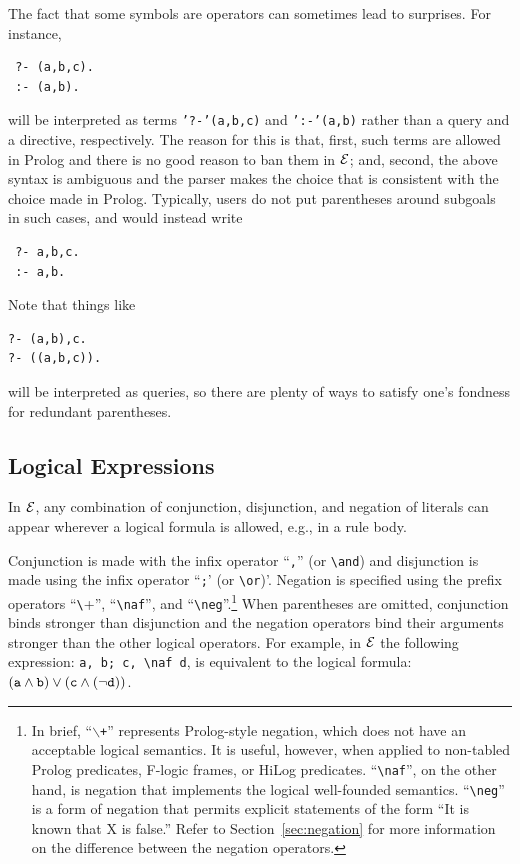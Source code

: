 \documentclass[11pt]{article}
\newcommand{\ERGO}{\mbox{\ensuremath{\cal{E}}\smaller{{\sc{RGO}}}}\xspace}
\newcommand{\FLSYSTEM}{\ERGO}
\newcommand{\bs}{\textbackslash}
\newcommand{\PLGNAF}{\mbox{\texttt{\bs}+}\xspace}
\newcommand{\RULELOGNAF}{{\texttt{{\bs}naf}}\xspace}
\newcommand{\RULELOGNEG}{{\texttt{{\bs}neg}}\xspace}
\begin{document}
The fact that some symbols are operators can sometimes lead to
surprises. For instance,
\begin{verbatim}
 ?- (a,b,c).
 :- (a,b).
\end{verbatim}
will be interpreted as terms {\tt '?-'(a,b,c)} and {\tt ':-'(a,b)} rather
than a query and a directive, respectively. The reason for this is that,
first, such terms are allowed in Prolog and there is no good reason to ban
them in \FLSYSTEM; and, second, the above syntax is ambiguous and the parser
makes the choice that is consistent with the choice made in
Prolog. Typically, users do not put parentheses around subgoals in such
cases, and would instead write
\begin{verbatim}
 ?- a,b,c.
 :- a,b.  
\end{verbatim}
Note that things like
\begin{verbatim}
?- (a,b),c.  
?- ((a,b,c)).
\end{verbatim}
will be interpreted as queries, so there are plenty of ways to satisfy
one's fondness for redundant parentheses.


\subsection{Logical Expressions}


%
In \FLSYSTEM, any combination of conjunction, disjunction, and
negation of literals can appear wherever a logical formula is allowed,
e.g., in a rule body.

Conjunction is made with the infix operator ``{\tt ,}'' (or
\texttt{\bs{}and})  and
disjunction is made using the infix operator ``{\tt ;}' (or
\texttt{\bs{}or})'.  Negation is
specified
using the prefix operators ``\PLGNAF'', ``\RULELOGNAF'', and ``\RULELOGNEG''.\footnote{
  In brief, ``{\tt $\backslash$+}'' represents Prolog-style negation, which
  does not have an acceptable logical semantics. It is useful, however,
  when applied
  to non-tabled Prolog predicates, F-logic frames, or HiLog
  predicates. ``\RULELOGNAF'', on the other hand, is negation that
  implements the logical well-founded semantics.
  ``\RULELOGNEG'' is a form of negation that permits explicit statements of
  the form ``It is known that X is false.''
  Refer to
  Section~\ref{sec:negation} for more information on the difference between
   the negation operators. 
  }
When parentheses are omitted, conjunction binds stronger than disjunction
and the negation operators bind their arguments stronger than the other
logical operators.  For example, in \FLSYSTEM the following expression:
{\tt a, b; c, \RULELOGNAF d}, is equivalent to the logical formula: $\tt (a
\wedge b) \vee (c \wedge (\neg d))$.
\end{document}
